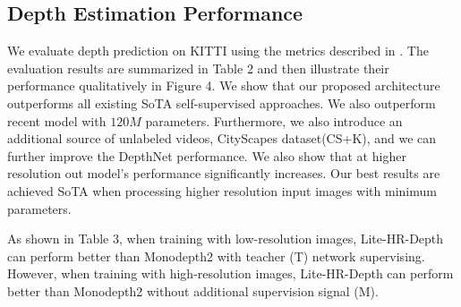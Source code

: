 \documentclass[letterpaper]{article} \usepackage{aaai21}  \usepackage{times}  \usepackage{helvet} \usepackage{courier}  \usepackage[hyphens]{url}  \usepackage{graphicx} \urlstyle{rm} \def\UrlFont{\rm}  \usepackage{natbib}  \usepackage{caption} \frenchspacing  \setlength{\pdfpagewidth}{8.5in}  \setlength{\pdfpageheight}{11in}  \usepackage{booktabs}
\begin{document}
\subsection{Depth Estimation Performance}
We evaluate depth prediction on KITTI using the metrics described in \cite{eigen2015predicting}. The evaluation results are summarized in Table 2 and then illustrate their performance qualitatively in Figure 4. 
We show that our proposed architecture outperforms all existing SoTA self-supervised approaches. We also outperform recent model \cite{packnet} with $120M$ parameters. Furthermore, we also introduce 
an additional source of unlabeled videos, CityScapes dataset(CS+K), and we can further improve the DepthNet performance. We also show that at higher resolution out model's performance significantly increases.
Our best results are achieved SoTA when processing higher resolution input images with minimum parameters. 

\noindent As shown in Table 3, when training with low-resolution images, Lite-HR-Depth can perform better than Monodepth2 with teacher (T) network supervising. However, when training with high-resolution images, 
Lite-HR-Depth can perform better than Monodepth2 without additional supervision signal (M).
\end{document}
